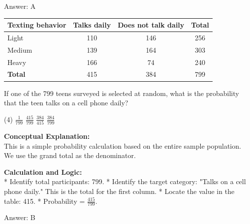 \documentclass[11pt,paper=a4,answers]{exam}
\begin{document}
\begin{questions}
\begin{solution}
Answer: \colorbox{yellow!100}{A}
\end{solution}

\vspace{60pt}

\question
\begin{center}
\begin{tabular}{|l|c|c|c|}
\hline
\textbf{Texting behavior} & \textbf{Talks daily} & \textbf{Does not talk daily} & \textbf{Total} \\ \hline
Light & 110 & 146 & 256 \\ \hline
Medium & 139 & 164 & 303 \\ \hline
Heavy & 166 & 74 & 240 \\ \hline
\textbf{Total} & 415 & 384 & 799 \\ \hline
\end{tabular}
\end{center}
If one of the 799 teens surveyed is selected at random, what is the probability that the teen talks on a cell phone daily?
\begin{tasks}(4)
    \task $\frac{1}{799}$
    \task $\frac{415}{799}$
    \task $\frac{384}{415}$
    \task $\frac{384}{799}$
\end{tasks}

\begin{solution}
\textbf{Conceptual Explanation:} \\
This is a simple probability calculation based on the entire sample population. We use the grand total as the denominator.

\vspace{30pt}

\textbf{Calculation and Logic:} \\
* Identify total participants: 799.
* Identify the target category: "Talks on a cell phone daily." This is the total for the first column.
* Locate the value in the table: 415.
* Probability = $\frac{415}{799}$.

\vspace{30pt}

Answer: \colorbox{yellow!100}{B}
\end{solution}

\vspace{60pt}


\end{questions}
\end{document}
